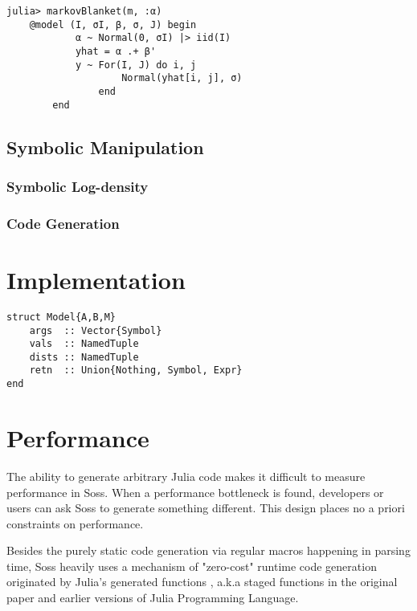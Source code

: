 \documentclass[anonymous=false, %
               format=acmsmall, %
               review=true, %
               screen=true, %
               nonacm=true]{acmart}
\begin{document}
\begin{verbatim}
julia> markovBlanket(m, :α)
    @model (I, σI, β, σ, J) begin
            α ~ Normal(0, σI) |> iid(I)
            yhat = α .+ β'
            y ~ For(I, J) do i, j
                    Normal(yhat[i, j], σ)
                end
        end 
\end{verbatim}


\subsection{Symbolic Manipulation}

\subsubsection*{Symbolic Log-density}

\subsubsection*{Code Generation}

\section{Implementation}

\begin{verbatim}
struct Model{A,B,M} 
    args  :: Vector{Symbol}
    vals  :: NamedTuple
    dists :: NamedTuple
    retn  :: Union{Nothing, Symbol, Expr}
end
\end{verbatim}


\section{Performance}



The ability to generate arbitrary  Julia code makes it difficult to measure performance in Soss. When a performance bottleneck is found, developers or users can ask Soss to generate something different. This design places no a priori constraints on performance.


Besides the purely static code generation via regular macros happening in parsing time, Soss heavily uses a mechanism of "zero-cost" runtime code generation originated by Julia's generated functions \cite{bezanson2012julia}, a.k.a staged functions in the original paper and earlier versions of Julia Programming Language.
\end{document}
